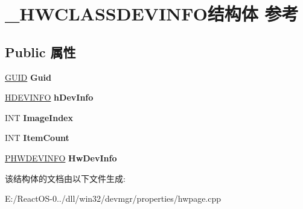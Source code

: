 \hypertarget{struct___h_w_c_l_a_s_s_d_e_v_i_n_f_o}{}\section{\+\_\+\+H\+W\+C\+L\+A\+S\+S\+D\+E\+V\+I\+N\+F\+O结构体 参考}
\label{struct___h_w_c_l_a_s_s_d_e_v_i_n_f_o}
\subsection*{Public 属性}
\begin{DoxyCompactItemize}
\item 
\mbox{\label{struct___h_w_c_l_a_s_s_d_e_v_i_n_f_o_aaefb1a9eb54cb81f122c54b465a3c742}} 
\hyperlink{interface_g_u_i_d}{G\+U\+ID} {\bfseries Guid}
\item 
\mbox{\label{struct___h_w_c_l_a_s_s_d_e_v_i_n_f_o_ae9c0a336c87307a47da661bf4dd9b670}} 
\hyperlink{interfacevoid}{H\+D\+E\+V\+I\+N\+FO} {\bfseries h\+Dev\+Info}
\item 
\mbox{\label{struct___h_w_c_l_a_s_s_d_e_v_i_n_f_o_a025e2bf17c96efc1c5edbff52e0e1cb3}} 
I\+NT {\bfseries Image\+Index}
\item 
\mbox{\label{struct___h_w_c_l_a_s_s_d_e_v_i_n_f_o_a0cef4ac947f254106ccecaecd6604455}} 
I\+NT {\bfseries Item\+Count}
\item 
\mbox{\label{struct___h_w_c_l_a_s_s_d_e_v_i_n_f_o_a4664b09c9bc435876a871e600033f571}} 
\hyperlink{struct___h_w_d_e_v_i_n_f_o}{P\+H\+W\+D\+E\+V\+I\+N\+FO} {\bfseries Hw\+Dev\+Info}
\end{DoxyCompactItemize}


该结构体的文档由以下文件生成\+:\begin{DoxyCompactItemize}
\item 
E\+:/\+React\+O\+S-\/0../dll/win32/devmgr/properties/hwpage.\+cpp\end{DoxyCompactItemize}
